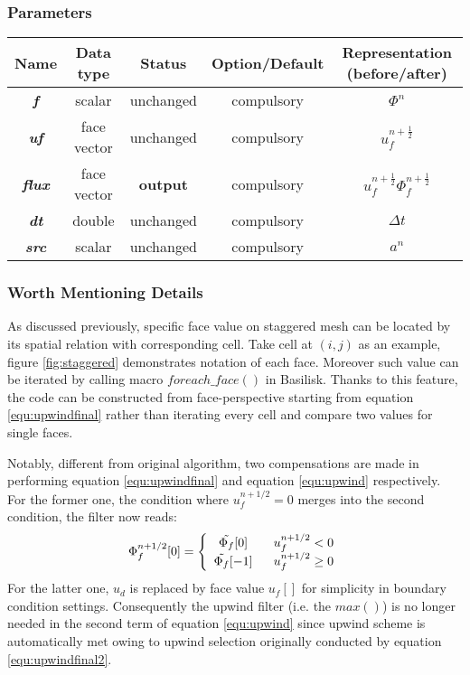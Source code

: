 \documentclass[a4paper]{article}
\newcommand{\para}[1]{\textbf{\emph{\textcolor{para}{#1}}}}
\begin{document}
\subsubsection{Parameters}
\begin{center}
  \begin{tabular}{|c|c|c|c|c|}
    \hline
    Name & Data type & Status & Option/Default & Representation (before/after)\\[0.5ex]
    \hline\hline
    \para{f} & scalar & unchanged & compulsory & $\Phi^n$\\
    \hline
    \para{uf} & face vector & unchanged & compulsory & $u_f^{n+ \frac{1}{2}}$\\
    \hline
    \rowcolor{output} \para{flux} & face vector & \textbf{output} & compulsory & $u_f^{n+ \frac{1}{2}}\Phi_f^{n+\frac{1}{2}}$\\
    \hline
    \para{dt} & double & unchanged & compulsory & $\Delta t$\\
    \hline
    \para{src} & scalar & unchanged & compulsory & $ a^n$ \\
    \hline
  \end{tabular}
\end{center}

\subsubsection{Worth Mentioning Details}\label{sec:tracerdetail}
As discussed previously, specific face value on staggered mesh\cite{1965_Harlow} can be located by its spatial relation with corresponding cell. Take cell at $(i,j)$ as an example, figure \ref{fig:staggered} demonstrates notation of each face. Moreover such value can be iterated by calling macro $foreach\_face()$ in Basilisk. Thanks to this feature, the code can be constructed from face-perspective starting from equation \ref{equ:upwindfinal} rather than iterating every cell and compare two values for single faces.\par
Notably, different from original algorithm, two compensations are made in performing equation \ref{equ:upwindfinal} and equation \ref{equ:upwind} respectively. For the former one, the condition where $u_f^{n+1/2}=0$ merges into the second condition, the filter now reads:
\begin{equation}
    \Phi^{n+1/2}_{f}[0] = \left\{
    \begin{array}{cc}
         \Tilde{\Phi_f}[0]\ \ &u^{n+1/2}_f<0\\
         \Tilde{\Phi_f}[-1]\ \ &u^{n+1/2}_f\geq0
    \end{array}
    \right.
    \label{equ:upwindfinal2}
\end{equation}
For the latter one, $u_d$ is replaced by face value $u_f[]$ for simplicity in boundary condition settings. Consequently the upwind filter (i.e. the $max()$) is no longer needed in the second term of equation \ref{equ:upwind} since upwind scheme is automatically met owing to upwind selection originally conducted by equation \ref{equ:upwindfinal2}. 
\end{document}
